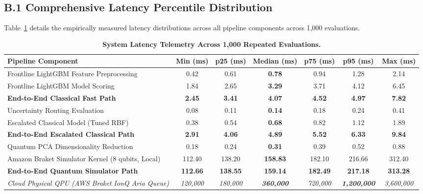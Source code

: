 \documentclass[10pt,a4paper]{article}
\begin{document}
\subsection*{B.1 Comprehensive Latency Percentile Distribution}
Table~\ref{tab:lat_bench} details the empirically measured latency distributions across all pipeline components across 1,000 evaluations.

\vspace{-2pt}
\begin{table}[h!]
\centering
\scriptsize
\renewcommand{\arraystretch}{0.76}
\caption{\textbf{System Latency Telemetry Across 1,000 Repeated Evaluations.}}
\label{tab:lat_bench}
\vspace{1pt}
\begin{tabularx}{\linewidth}{@{}lcccccc@{}}
\toprule
\textbf{Pipeline Component} & \textbf{Min (ms)} & \textbf{p25 (ms)} & \textbf{Median (ms)} & \textbf{p75 (ms)} & \textbf{p95 (ms)} & \textbf{Max (ms)} \\
\midrule
Frontline LightGBM Feature Preprocessing & 0.42 & 0.61 & \textbf{0.78} & 0.94 & 1.28 & 2.14 \\
Frontline LightGBM Model Scoring & 1.84 & 2.65 & \textbf{3.29} & 3.71 & 4.12 & 6.45 \\
\textbf{End-to-End Classical Fast Path} & \textbf{2.45} & \textbf{3.41} & \textbf{4.07} & \textbf{4.52} & \textbf{4.97} & \textbf{7.82} \\
\midrule
Uncertainty Routing Evaluation & 0.08 & 0.11 & \textbf{0.14} & 0.18 & 0.24 & 0.41 \\
Escalated Classical Model (Tuned RBF) & 0.38 & 0.54 & \textbf{0.68} & 0.82 & 1.12 & 1.89 \\
\textbf{End-to-End Escalated Classical Path} & \textbf{2.91} & \textbf{4.06} & \textbf{4.89} & \textbf{5.52} & \textbf{6.33} & \textbf{9.84} \\
\midrule
Quantum PCA Dimensionality Reduction & 0.18 & 0.24 & \textbf{0.31} & 0.39 & 0.52 & 0.88 \\
Amazon Braket Simulator Kernel (8 qubits, Local) & 112.40 & 138.20 & \textbf{158.83} & 182.10 & 216.66 & 312.40 \\
\textbf{End-to-End Quantum Simulator Path} & \textbf{112.66} & \textbf{138.55} & \textbf{159.14} & \textbf{182.49} & \textbf{217.18} & \textbf{313.28} \\
\midrule
\textit{Cloud Physical QPU (AWS Braket IonQ Aria Queue)} & \textit{120,000} & \textit{180,000} & \textit{\textbf{360,000}} & \textit{720,000} & \textit{\textbf{1,200,000}} & \textit{3,600,000} \\
\bottomrule
\end{tabularx}
\end{table}
\vspace{-5pt}
\end{document}

